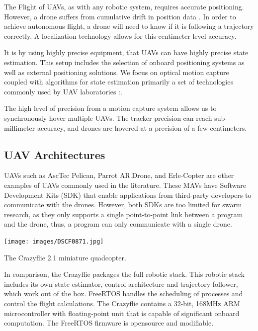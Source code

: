 The Flight of UAVs, as with any robotic system, requires accurate positioning. However, a drone suffers from cumulative drift in position data \cite{uav_components}. In order to achieve autonomous flight, a drone will need to know if it is following a trajectory correctly. A localization technology allows for this
centimeter level accuracy.

It is by using highly precise equipment, that UAVs can have highly precise state estimation. This setup includes the selection of onboard positioning systems as well as external positioning solutions. We focus on optical motion capture coupled with algorithms for state estimation primarily a set of technologies commonly used by UAV laboratories\cite{phan_hönig_ayanian_2018} \cite{laclau_tempez_ruffier_natalizio_mouret_2020} \cite{fma_paper}:. 

The high level of precision from a motion capture system allows us to synchronously hover multiple UAVs. The tracker precision can reach sub-millimeter accuracy, and drones are hovered at a precision of a few centimeters.




\subsection{UAV Architectures}

UAVs such as AscTec Pelican, Parrot AR.Drone, and Erle-Copter are other examples of UAVs commonly used in the literature. These MAVs have Software Development Kits (SDK) that enable applications from third-party developers to communicate with the drones. However, both SDKs are too limited for swarm research, as they only supports a single point-to-point link between a program and the drone, thus, a program can only communicate with a single drone.

\begin{marginfigure}%
  \texttt{[image: images/DSCF0871.jpg]}
  \caption{The Crazyflie 2.1 miniature quadcopter.  }
\end{marginfigure}

In comparison, the Crazyflie packages the full robotic stack. This robotic stack includes its own state estimator, control architecture and trajectory follower, which work out of the box. FreeRTOS handles the scheduling of processes and control the flight calculations. The Crazyflie contains a 32-bit, 168MHz ARM microcontroller with floating-point unit that is capable of significant onboard computation. The FreeRTOS firmware is opensource and modifiable. 

